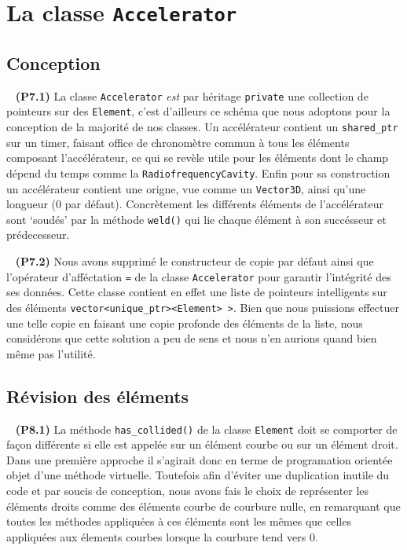 \documentclass[12pt, letterpaper, twoside]{article}
\newcommand{\T}[1]{\texttt{#1}}
\begin{document}
\section{La classe \T{Accelerator}}

\subsection{Conception}

\ \linebreak
\noindent \textbf{(P7.1)} La classe \T{Accelerator} \emph{est} par héritage \T{private} une collection de pointeurs sur des \T{Element}, c'est d'ailleurs ce schéma que nous adoptons pour la conception de la majorité de nos classes. Un accélérateur contient un \T{shared\_ptr} sur un timer, faisant office de chronomètre commun à tous les éléments composant l'accélérateur, ce qui se revèle utile pour les éléments dont le champ dépend du temps comme la \T{RadiofrequencyCavity}. Enfin pour sa construction un accélérateur contient une origne, vue comme un \T{Vector3D}, ainsi qu'une longueur (0 par défaut). Concrètement les différents éléments de l'accélérateur sont `soudés' par la méthode \T{weld()} qui lie chaque élément à son succésseur et prédecesseur.

\ \linebreak
\noindent \textbf{(P7.2)} Nous avons supprimé le constructeur de copie par défaut ainsi que l'opérateur d'afféctation \T{=} de la classe \T{Accelerator} pour garantir l'intégrité des ses données. Cette classe contient en effet une liste de pointeurs intelligents sur des éléments \T{vector<unique\_ptr><Element> >}. Bien que nous puissions effectuer une telle copie en faisant une copie profonde des éléments de la liste, nous considérons que cette solution a peu de sens et nous n'en aurions quand bien même pas l'utilité. 

\subsection{Révision des éléments}

\ \linebreak
\noindent \textbf{(P8.1)} La méthode \T{has\_collided()} de la classe \T{Element} doit se comporter de façon différente si elle est appelée sur un élément courbe ou sur un élément droit. Dans une première approche il s'agirait donc en terme de programation orientée objet d'une méthode virtuelle. Toutefois afin d'éviter une duplication inutile du code et par soucis de conception, nous avons fais le choix de représenter les éléments droits comme des éléments courbe de courbure nulle, en remarquant que toutes les méthodes appliquées à ces éléments sont les mêmes que celles appliquées aux élements courbes lorsque la courbure tend vers 0.
\end{document}

